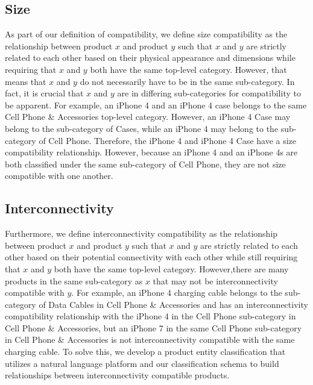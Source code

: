 \subsection{Size}
As part of our definition of compatibility, we define size compatibility as the relationship between product $x$ and product $y$ such that $x$ and $y$ are strictly related to each other based on their physical appearance and dimensions while requiring that $x$ and $y$ both have the same top-level category. However, that means that $x$ and $y$ do not necessarily have to be in the same sub-category. In fact, it is crucial that $x$ and $y$ are in differing sub-categories for compatibility to be apparent. For example, an iPhone 4 and an iPhone 4 case belongs to the same Cell Phone \& Accessories top-level category. However, an iPhone 4 Case may belong to the sub-category of Cases, while an iPhone 4 may belong to the sub-category of Cell Phone. Therefore, the iPhone 4 and iPhone 4 Case have a size compatibility relationship. However, because an iPhone 4 and an iPhone 4s are both classified under the same sub-category of Cell Phone, they are not size compatible with one another.

\subsection{Interconnectivity}
Furthermore, we define interconnectivity compatibility as the relationship between product $x$ and product $y$ such that $x$ and $y$ are strictly related to each other based on their potential connectivity with each other while still requiring that $x$ and $y$ both have the same top-level category. However,there are many products in the same sub-category as $x$ that may not be interconnectivity compatible with $y$. For example, an iPhone 4 charging cable belongs to the sub-category of Data Cables in Cell Phone \& Accessories and has an interconnectivity compatibility relationship with the iPhone 4 in the Cell Phone sub-category in Cell Phone \& Accessories, but an iPhone 7 in the same Cell Phone sub-category in Cell Phone \& Accessories is not interconnectivity compatible with the same charging cable. To solve this, we develop a product entity classification that utilizes a natural language platform and our classification schema to build relationships between interconnectivity compatible products.


